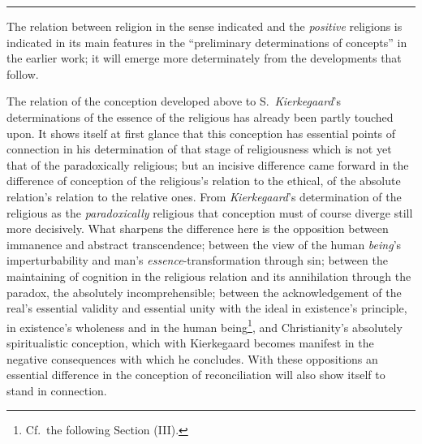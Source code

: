 \documentclass[12pt,a4paper]{book}
\begin{document}
\begin{center}\rule{2cm}{0.4pt}\end{center}

The relation between religion in the sense indicated and the \emph{positive}
religions is indicated in its main features in the ``preliminary
determinations of concepts'' in the earlier work; it will emerge more
determinately from the developments that follow.

The relation of the conception developed above to S.\ \emph{Kierkegaard}'s
determinations of the essence of the religious has
\setcounter{footnote}{0}%
already been partly touched upon. It shows itself at first glance that this
conception has essential points of connection in his determination of that
stage of religiousness which is not yet that of the paradoxically religious;
but an incisive difference came forward in the difference of conception of the
religious's relation to the ethical, of the absolute relation's relation to
the relative ones. From \emph{Kierkegaard}'s determination of the religious as
the \emph{paradoxically} religious that conception must of course diverge
still more decisively. What sharpens the difference here is the opposition
between immanence and abstract transcendence; between the view of the human
\emph{being}'s imperturbability and man's \emph{essence}-transformation
through sin; between the maintaining of cognition in the religious relation
and its annihilation through the paradox, the absolutely incomprehensible;
between the acknowledgement of the real's essential validity and essential
unity with the ideal in existence's principle, in existence's wholeness and in
the human being\footnote{Cf.\ the following Section (III).}, and
Christianity's absolutely spiritualistic conception, which with Kierkegaard
becomes manifest in the negative consequences with which he concludes. With
these oppositions an essential difference in the conception of reconciliation
will also show itself to stand in connection.
\end{document}
